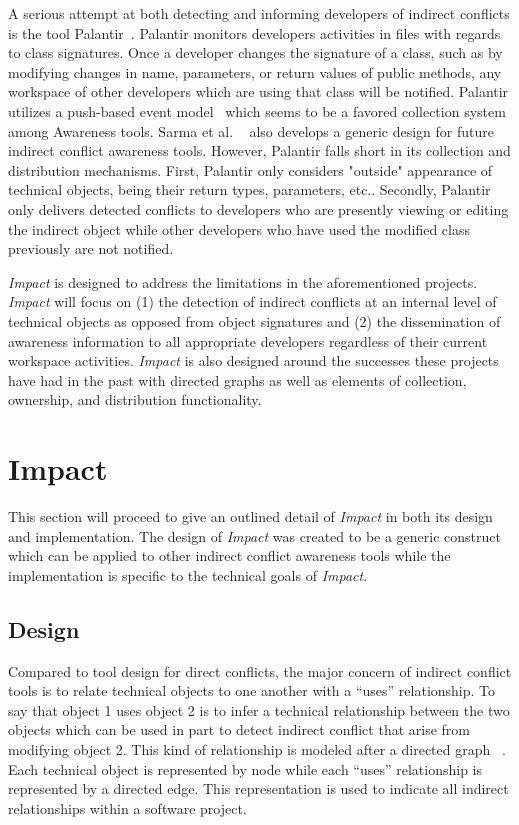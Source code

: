 \documentclass[conference]{IEEEtran}
\begin{document}
A serious attempt at both detecting and informing developers of
indirect conflicts is the tool Palantir~\cite{Sarma:2007:TSA}. Palantir
monitors developers activities in files with regards to class signatures.
Once a developer changes the signature of a class, such as by modifying changes
in name, parameters, or return values of public methods, any workspace
of other developers which are using that class will be notified. Palantir utilizes
a push-based event model~\cite{Fitzpatrick:2002:SPA} which seems to be
a favored collection system among Awareness tools. Sarma et al.
~\cite{Sarma:2007:TSA} also
develops a generic design for future indirect conflict awareness tools. 
However, Palantir falls short in its collection and distribution
mechanisms. First, Palantir only considers "outside" appearance of technical
objects, being their return types, parameters, etc.. Secondly, Palantir 
only delivers
detected conflicts to developers who are presently viewing or editing
the indirect object while other developers who have used the modified 
class previously are not notified.

\textit{Impact} is designed to address the limitations in the aforementioned projects.
\textit{Impact} will focus on (1) the detection of indirect conflicts at an internal level
of technical objects as opposed from object signatures and (2) the dissemination of
awareness information to all appropriate developers regardless of their current
workspace activities. \textit{Impact} is also designed around the successes these
projects have had in the past with directed graphs as 
well as elements of collection, ownership, and distribution functionality.


\section{Impact}
This section will proceed to give an outlined detail of \textit{Impact} in both its
design and implementation. The design of \textit{Impact} was created to be
a generic construct which can be applied to other indirect conflict 
awareness tools while the implementation is specific to the technical
goals of \textit{Impact}.

\subsection{Design}
Compared to tool design for direct conflicts, the major concern of 
indirect conflict tools is to relate technical objects to one another
with a ``uses'' relationship. To say that object 1 uses object 2 is to infer
a technical relationship between the two objects which can be used
in part to detect indirect conflict that arise from modifying object
2. This kind of relationship is modeled after a directed graph ~\cite{Horwitz:1992:UPD}. 
Each technical object is represented by node while each ``uses''
relationship is represented by a directed edge. This representation
is used to indicate all indirect relationships within a software project.
\end{document}

